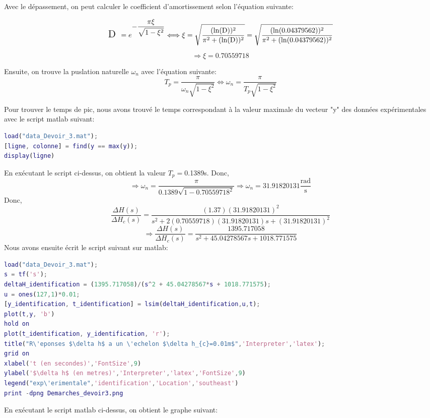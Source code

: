 \center \Large {}

\raggedright \normalsize Avec le dépassement, on peut calculer le coefficient d'amortissement selon l'équation suivante: 

$$\text{\Large D }=e^{\displaystyle -\frac{\pi \xi}{\sqrt{1-\xi^2}}}\Longleftrightarrow\xi = \sqrt{\frac{(\ln(\text{D}))^2}{\pi^2+(\ln(\text{D}))^2}}=\sqrt{\frac{(\ln(0.04379562))^2}{\pi^2+(\ln(0.04379562))^2}}$$ 

$$\Rightarrow \xi=0.70559718$$

\raggedright \normalsize Ensuite, on trouve la puslation naturelle $\omega_{n}$ avec l'équation suivante: $$T_{p}=\frac{\pi}{\omega_{n}\sqrt{1-\xi^2}}\Longleftrightarrow\omega_{n}=\frac{\pi}{T_{p}\sqrt{1-\xi^2}}$$

Pour trouver le temps de pic, nous avons trouvé le temps correspondant à la valeur maximale du vecteur "y" des données expérimentales avec le script matlab suivant:
\begin{lstlisting}[language=Matlab]
load("data_Devoir_3.mat");
[ligne, colonne] = find(y == max(y));
display(ligne)
\end{lstlisting}
En exécutant le script ci-dessus, on obtient la valeur $T_{p}=$0.1389s. Donc, $$\Rightarrow\omega_{n}=\frac{\pi}{0.1389\sqrt{1-0.70559718^2}}\Rightarrow\omega_{n}=31.91820131\frac{\text{rad}}{\text{s}}$$ Donc, $$\frac{\Delta H(s)}{\Delta H_{c}(s)}=\frac{(1.37)(31.91820131)^2}{s^2+2(0.70559718)(31.91820131)s+(31.91820131)^2}$$
\begin{equation}
\boxed{\Rightarrow\frac{\Delta H(s)}{\Delta H_{c}(s)}=\frac{1395.717058}{s^2+45.04278567s+1018.771575} \tag*{(FT de l'identification)}}
\end{equation}
Nous avons ensuite écrit le script suivant sur matlab:
\begin{lstlisting}[language=Matlab]
load("data_Devoir_3.mat");
s = tf('s');
deltaH_identification = (1395.717058)/(s^2 + 45.04278567*s + 1018.771575);
u = ones(127,1)*0.01;
[y_identification, t_identification] = lsim(deltaH_identification,u,t);
plot(t,y, 'b')
hold on
plot(t_identification, y_identification, 'r');
title("R\'eponses $\delta h$ a un \'echelon $\delta h_{c}=0.01m$",'Interpreter','latex');
grid on
xlabel('t (en secondes)','FontSize',9)
ylabel('$\delta h$ (en metres)','Interpreter','latex','FontSize',9)
legend("exp\'erimentale",'identification','Location','southeast')
print -dpng Demarches_devoir3.png
\end{lstlisting} \newpage \noindent
En exécutant le script matlab ci-dessus, on obtient le graphe suivant:

